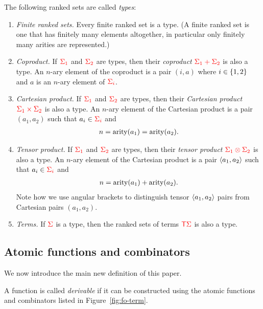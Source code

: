 \begin{definition}[Types] \label{def:types} The following ranked sets are called \emph{types}:
    \begin{enumerate}
        \item  \emph{Finite ranked sets.} Every finite  ranked set is a type. (A finite ranked set is one that  has finitely many elements altogether, in particular only finitely many arities are represented.)
        \item \emph{Coproduct.} If ${\color{red}{\Sigma_1}}$ and ${\color{red}{\Sigma_2}}$ are types, then  their \emph{coproduct} ${\color{red}{\Sigma_1 + \Sigma_2}}$
        is also a type. An $n$-ary element of the coproduct is a pair $(i,a)$ where $i \in \{1,2\}$ and $a$ is an $n$-ary element of  ${\color{red}{\Sigma_i}}$. 
        \item \emph{Cartesian product.} If ${\color{red}{\Sigma_1}}$ and ${\color{red}{\Sigma_2}}$ are types, then  their \emph{Cartesian product}
        $ {\color{red}{\Sigma_1 \times \Sigma_2}}$
        is also a type. An $n$-ary element of the Cartesian product is a pair $(a_1,a_2)$ such that $a_i \in {\color{red}{\Sigma_i}}$ and 
        \begin{align*}
            n = \mathrm{arity}(a_1) = \mathrm{arity}(a_2).
        \end{align*}
        \item \emph{Tensor product.} If ${\color{red}{\Sigma_1}}$ and ${\color{red}{\Sigma_2}}$ are types, then  their \emph{tensor product}
        $ {\color{red}{\Sigma_1 \otimes \Sigma_2}}$
        is also a type. An $n$-ary element of the Cartesian product is a pair $\langle{a_1,a_2}\rangle$ such that $a_i \in {\color{red}{\Sigma_i}}$ and 
        \begin{align*}
            n = \mathrm{arity}(a_1) + \mathrm{arity}(a_2).
        \end{align*}
        Note how we use  angular brackets to distinguish tensor $\langle{a_1,a_2}\rangle$ pairs from Cartesian pairs $(a_1,a_2)$.
        \item \emph{Terms.} If ${\color{red}{\Sigma}}$ is a type, then  the ranked sets of terms  ${\color{red}{\mathsf T}} {\color{red}{\Sigma}}$ is also a type.
    \end{enumerate}
\end{definition}

\subsection{Atomic functions and combinators}
We now introduce the main new definition of this paper.

\begin{definition}
    A function is called \emph{derivable} if it can be constructed using the atomic functions and combinators listed in Figure~\ref{fig:fo-term}. 
\end{definition}



